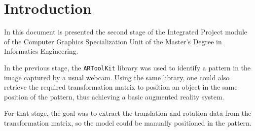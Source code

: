 \documentclass{acmtog}
\begin{document}
\begin{abstract} 
\end{abstract}


\section{Introduction}
In this document is presented the second stage of the Integrated Project module of the Computer Graphics Specialization Unit of the Master's Degree in Informatics Engineering.

In the previous stage, the \texttt{ARToolKit} library was used to identify a pattern in the image captured by a usual webcam. Using the same library, one could also retrieve the required transformation matrix to position an object in the same position of the pattern, thus achieving a basic augmented reality system.

For that stage, the goal was to extract the translation and rotation data from the transformation matrix, so the model could be manually positioned in the pattern.
\end{document}
